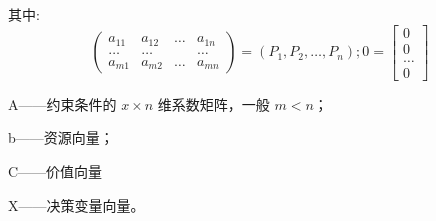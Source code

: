 其中:\\
$$
\begin{pmatrix}
    a_{11}  & a_{12} &… &a_{1n} \\
     … &  …& &…\\
     a_{m1} & a_{m2} &…&a_{mn}
    \end{pmatrix}=\left ( P_1,P_2,…,P_n \right ) 
    ;0=\begin{bmatrix}
     0\\
     0\\
     …\\
    0
\end{bmatrix}
$$



A——约束条件的 $x \times n$ 维系数矩阵，一般 $m < n$；

b——资源向量；

C——价值向量

X——决策变量向量。







